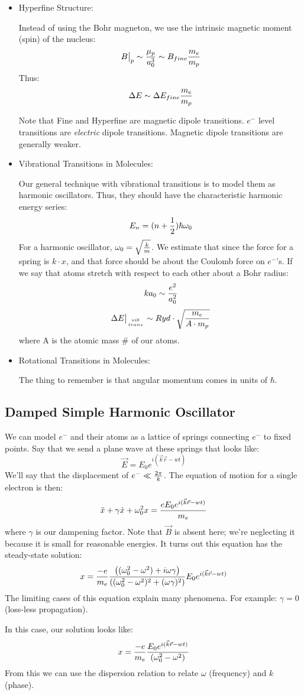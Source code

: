 \documentclass[11pt]{article}
\def\.{\dot}
\def\hf{{1 \over 2}}
\def\eval#1{\big|_{#1}}
\def\wz{\omega_0}
\def\ef{\vec E}
\def\bfield{{\vec B}}
\begin{document}
\begin{itemize}
\item Hyperfine Structure:\par
Instead of using the Bohr magneton, we use the intrinsic magnetic moment
(spin) of the nucleus:
$$B\eval{p}\sim{\mu_p\over a_0^3}\sim B_{fine}{m_e\over m_p}$$
Thus:
$$\Delta E\sim\Delta E_{fine}{m_e\over m_p}$$

Note that Fine and Hyperfine are magnetic dipole transitions.  $e^-$ level
transitions are {\it electric} dipole transitions.  Magnetic dipole transitions
are generally weaker.

\item  Vibrational Transitions in Molecules:\par
Our general technique with vibrational transitions is to model them as
harmonic oscillators.  Thus, they should have the characteristic harmonic
energy series:
$$E_n=(n+\hf)\hbar\wz$$
For a harmonic oscillator, $\wz=\sqrt{k\over m}$.  We estimate that since
the force for a spring is $k\cdot x$, and that force should be about the 
Coulomb force on $e^-$'s.  If we say that atoms stretch with respect to
each other about a Bohr radius:
$$ka_0\sim{e^2\over a_0^2}$$
$$\Delta E\eval{vib\atop trans}\sim Ryd\cdot\sqrt{m_e\over A\cdot m_p}$$
where A is the atomic mass \# of our atoms.

\item  Rotational Transitions in Molecules:\par
The thing to remember is that angular momentum comes in units of $\hbar$.
\end{itemize}

\subsection*{ Damped Simple Harmonic Oscillator}

We can model $e^-$ and their atoms as a lattice of springs connecting $e^-$
to fixed points.  Say that we send a plane wave at these springs that
looks like:
\def\eikrwt{e^{i(\vec k\vec r-wt)}}
$$\ef=E_0\eikrwt$$
We'll say that the displacement of $e^-\ll{2\pi\over k}$.  The equation of
motion for a single electron is then:
$$\ddot x+\gamma\.x+\wz^2x={eE_0\eikrwt\over m_e}$$
where $\gamma$ is our dampening factor.  Note that $\bfield$ is absent 
here; we're neglecting it because it is small for
reasonable energies. It turns out this
equation has the steady-state solution:
$$x={-e\over m_e}{\left((\wz^2-\omega^2)+i\omega\gamma\right)\over
\left((\wz^2-\omega^2)^2+(\omega\gamma)^2\right)}E_0\eikrwt$$
The limiting cases of this equation explain many phenomena.  For example:
$\gamma=0$ (loss-less propagation).\par
In this case, our solution looks like:
$$x={-e\over m_e}{E_0\eikrwt\over(\wz^2-\omega^2)}$$
From this we can use the dispersion relation to relate $\omega$ (frequency) and
$k$ (phase).
\end{document}
